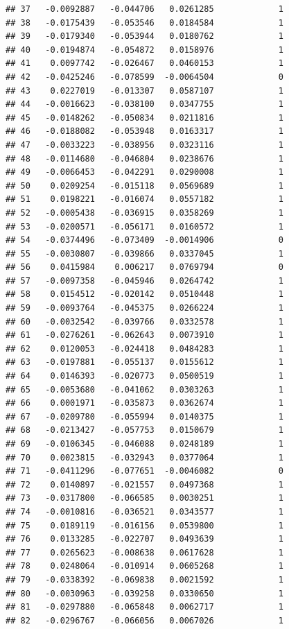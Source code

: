 \documentclass[12pt]{article}\usepackage[]{graphicx}\usepackage[]{xcolor}
\makeatletter
\newenvironment{kframe}{%
 \def\at@end@of@kframe{}%
 \ifinner\ifhmode%
  \def\at@end@of@kframe{\end{minipage}}%
  \begin{minipage}{\columnwidth}%
 \fi\fi%
 \def\FrameCommand##1{\hskip\@totalleftmargin \hskip-\fboxsep
 \colorbox{shadecolor}{##1}\hskip-\fboxsep
     \hskip-\linewidth \hskip-\@totalleftmargin \hskip\columnwidth}%
 \MakeFramed {\advance\hsize-\width
   \@totalleftmargin\z@ \linewidth\hsize
   \@setminipage}}%
 {\par\unskip\endMakeFramed%
 \at@end@of@kframe}
\newenvironment{knitrout}{}{} %
\makeatother
\begin{document}
\begin{knitrout}
\begin{kframe}
\begin{verbatim}
## 37   -0.0092887   -0.044706   0.0261285             1
## 38   -0.0175439   -0.053546   0.0184584             1
## 39   -0.0179340   -0.053944   0.0180762             1
## 40   -0.0194874   -0.054872   0.0158976             1
## 41    0.0097742   -0.026467   0.0460153             1
## 42   -0.0425246   -0.078599  -0.0064504             0
## 43    0.0227019   -0.013307   0.0587107             1
## 44   -0.0016623   -0.038100   0.0347755             1
## 45   -0.0148262   -0.050834   0.0211816             1
## 46   -0.0188082   -0.053948   0.0163317             1
## 47   -0.0033223   -0.038956   0.0323116             1
## 48   -0.0114680   -0.046804   0.0238676             1
## 49   -0.0066453   -0.042291   0.0290008             1
## 50    0.0209254   -0.015118   0.0569689             1
## 51    0.0198221   -0.016074   0.0557182             1
## 52   -0.0005438   -0.036915   0.0358269             1
## 53   -0.0200571   -0.056171   0.0160572             1
## 54   -0.0374496   -0.073409  -0.0014906             0
## 55   -0.0030807   -0.039866   0.0337045             1
## 56    0.0415984    0.006217   0.0769794             0
## 57   -0.0097358   -0.045946   0.0264742             1
## 58    0.0154512   -0.020142   0.0510448             1
## 59   -0.0093764   -0.045375   0.0266224             1
## 60   -0.0032542   -0.039766   0.0332578             1
## 61   -0.0276261   -0.062643   0.0073910             1
## 62    0.0120053   -0.024418   0.0484283             1
## 63   -0.0197881   -0.055137   0.0155612             1
## 64    0.0146393   -0.020773   0.0500519             1
## 65   -0.0053680   -0.041062   0.0303263             1
## 66    0.0001971   -0.035873   0.0362674             1
## 67   -0.0209780   -0.055994   0.0140375             1
## 68   -0.0213427   -0.057753   0.0150679             1
## 69   -0.0106345   -0.046088   0.0248189             1
## 70    0.0023815   -0.032943   0.0377064             1
## 71   -0.0411296   -0.077651  -0.0046082             0
## 72    0.0140897   -0.021557   0.0497368             1
## 73   -0.0317800   -0.066585   0.0030251             1
## 74   -0.0010816   -0.036521   0.0343577             1
## 75    0.0189119   -0.016156   0.0539800             1
## 76    0.0133285   -0.022707   0.0493639             1
## 77    0.0265623   -0.008638   0.0617628             1
## 78    0.0248064   -0.010914   0.0605268             1
## 79   -0.0338392   -0.069838   0.0021592             1
## 80   -0.0030963   -0.039258   0.0330650             1
## 81   -0.0297880   -0.065848   0.0062717             1
## 82   -0.0296767   -0.066056   0.0067026             1

\end{verbatim}
\end{kframe}
\end{knitrout}
\end{document}
